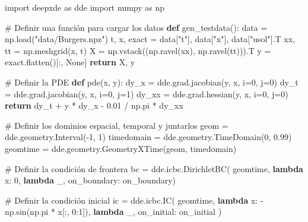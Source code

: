 \documentclass[
  spanish,
  us-letterpaper,
  DIV=11,
  numbers=noendperiod]{scrreprt}
\newenvironment{Shaded}{\begin{snugshade}}{\end{snugshade}}
\newcommand{\CommentTok}[1]{\textcolor[rgb]{0.37,0.37,0.37}{#1}}
\newcommand{\ControlFlowTok}[1]{\textcolor[rgb]{0.00,0.23,0.31}{\textbf{#1}}}
\newcommand{\DecValTok}[1]{\textcolor[rgb]{0.68,0.00,0.00}{#1}}
\newcommand{\FloatTok}[1]{\textcolor[rgb]{0.68,0.00,0.00}{#1}}
\newcommand{\ImportTok}[1]{\textcolor[rgb]{0.00,0.46,0.62}{#1}}
\newcommand{\KeywordTok}[1]{\textcolor[rgb]{0.00,0.23,0.31}{\textbf{#1}}}
\newcommand{\NormalTok}[1]{\textcolor[rgb]{0.00,0.23,0.31}{#1}}
\newcommand{\OperatorTok}[1]{\textcolor[rgb]{0.37,0.37,0.37}{#1}}
\newcommand{\StringTok}[1]{\textcolor[rgb]{0.13,0.47,0.30}{#1}}
\newcommand{\VariableTok}[1]{\textcolor[rgb]{0.07,0.07,0.07}{#1}}
\theoremstyle{plain}
\theoremstyle{definition}
\theoremstyle{remark}
\begin{document}
\begin{Shaded}
\begin{Highlighting}[]
\ImportTok{import}\NormalTok{ deepxde }\ImportTok{as}\NormalTok{ dde}
\ImportTok{import}\NormalTok{ numpy }\ImportTok{as}\NormalTok{ np}

\CommentTok{\# Definir una función para cargar los datos}
\KeywordTok{def}\NormalTok{ gen\_testdata():}
\NormalTok{    data }\OperatorTok{=}\NormalTok{ np.load(}\StringTok{"data/Burgers.npz"}\NormalTok{)}
\NormalTok{    t, x, exact }\OperatorTok{=}\NormalTok{ data[}\StringTok{"t"}\NormalTok{], data[}\StringTok{"x"}\NormalTok{], data[}\StringTok{"usol"}\NormalTok{].T}
\NormalTok{    xx, tt }\OperatorTok{=}\NormalTok{ np.meshgrid(x, t)}
\NormalTok{    X }\OperatorTok{=}\NormalTok{ np.vstack((np.ravel(xx), np.ravel(tt))).T}
\NormalTok{    y }\OperatorTok{=}\NormalTok{ exact.flatten()[:, }\VariableTok{None}\NormalTok{]}
    \ControlFlowTok{return}\NormalTok{ X, y}

\CommentTok{\# Definir la PDE}
\KeywordTok{def}\NormalTok{ pde(x, y):}
\NormalTok{    dy\_x }\OperatorTok{=}\NormalTok{ dde.grad.jacobian(y, x, i}\OperatorTok{=}\DecValTok{0}\NormalTok{, j}\OperatorTok{=}\DecValTok{0}\NormalTok{)}
\NormalTok{    dy\_t }\OperatorTok{=}\NormalTok{ dde.grad.jacobian(y, x, i}\OperatorTok{=}\DecValTok{0}\NormalTok{, j}\OperatorTok{=}\DecValTok{1}\NormalTok{)}
\NormalTok{    dy\_xx }\OperatorTok{=}\NormalTok{ dde.grad.hessian(y, x, i}\OperatorTok{=}\DecValTok{0}\NormalTok{, j}\OperatorTok{=}\DecValTok{0}\NormalTok{)}
    \ControlFlowTok{return}\NormalTok{ dy\_t }\OperatorTok{+}\NormalTok{ y }\OperatorTok{*}\NormalTok{ dy\_x }\OperatorTok{{-}} \FloatTok{0.01} \OperatorTok{/}\NormalTok{ np.pi }\OperatorTok{*}\NormalTok{ dy\_xx}

\CommentTok{\# Definir los dominios espacial, temporal y juntarlos}
\NormalTok{geom }\OperatorTok{=}\NormalTok{ dde.geometry.Interval(}\OperatorTok{{-}}\DecValTok{1}\NormalTok{, }\DecValTok{1}\NormalTok{)}
\NormalTok{timedomain }\OperatorTok{=}\NormalTok{ dde.geometry.TimeDomain(}\DecValTok{0}\NormalTok{, }\FloatTok{0.99}\NormalTok{)}
\NormalTok{geomtime }\OperatorTok{=}\NormalTok{ dde.geometry.GeometryXTime(geom, timedomain)}

\CommentTok{\# Definir la condición de frontera}
\NormalTok{bc }\OperatorTok{=}\NormalTok{ dde.icbc.DirichletBC(}
\NormalTok{    geomtime,}
    \KeywordTok{lambda}\NormalTok{ x: }\DecValTok{0}\NormalTok{,}
    \KeywordTok{lambda}\NormalTok{ \_, on\_boundary: on\_boundary)}

\CommentTok{\# Definir la condición inicial}
\NormalTok{ic }\OperatorTok{=}\NormalTok{ dde.icbc.IC(}
\NormalTok{    geomtime,}
    \KeywordTok{lambda}\NormalTok{ x: }\OperatorTok{{-}}\NormalTok{np.sin(np.pi }\OperatorTok{*}\NormalTok{ x[:, }\DecValTok{0}\NormalTok{:}\DecValTok{1}\NormalTok{]),}
    \KeywordTok{lambda}\NormalTok{ \_, on\_initial: on\_initial}
\NormalTok{)}


\end{Highlighting}
\end{Shaded}
\end{document}

